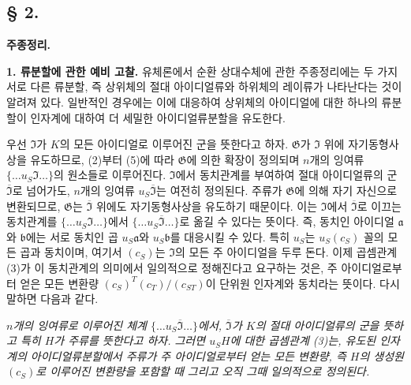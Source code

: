 \subsection*{§ 2.}
\begin{center}
\textbf{주종정리.}
\end{center}

\noindent\textbf{1. 류분할에 관한 예비 고찰.} 유체론에서 순환 상대수체에 관한 주종정리에는 두 가지 서로 다른 류분할, 즉 상위체의 절대 아이디얼류와 하위체의 레이류가 나타난다는 것이 알려져 있다. 일반적인 경우에는 이에 대응하여 상위체의 아이디얼에 대한 하나의 류분할이 인자계에 대하여 더 세밀한 아이디얼류분할을 유도한다.

우선 \(\mathfrak I\)가 \(K\)의 모든 아이디얼로 이루어진 군을 뜻한다고 하자. \(\mathfrak G\)가 \(\mathfrak I\) 위에 자기동형사상을 유도하므로, (2)부터 (5)에 따라 \(\mathfrak G\)에 의한 확장이 정의되며 \(n\)개의 잉여류 \(\{\ldots u_S\mathfrak I\ldots\}\)의 원소들로 이루어진다. \(\mathfrak I\)에서 동치관계를 부여하여 절대 아이디얼류의 군 \(\overline{\mathfrak I}\)로 넘어가도, \(n\)개의 잉여류 \(u_S\overline{\mathfrak I}\)는 여전히 정의된다. 주류가 \(\mathfrak G\)에 의해 자기 자신으로 변환되므로, \(\mathfrak G\)는 \(\overline{\mathfrak I}\) 위에도 자기동형사상을 유도하기 때문이다. 이는 \(\mathfrak I\)에서 \(\overline{\mathfrak I}\)로 이끄는 동치관계를 \(\{\ldots u_S\mathfrak I\ldots\}\)에서 \(\{\ldots u_S\overline{\mathfrak I}\ldots\}\)로 옮길 수 있다는 뜻이다. 즉, 동치인 아이디얼 \(\mathfrak a\)와 \(\mathfrak b\)에는 서로 동치인 곱 \(u_S\mathfrak a\)와 \(u_S\mathfrak b\)를 대응시킬 수 있다. 특히 \(u_S\)는 \(u_S(c_S)\) 꼴의 모든 곱과 동치이며, 여기서 \((c_S)\)는 \(\mathfrak I\)의 모든 주 아이디얼을 두루 돈다. 이제 곱셈관계 (3)가 이 동치관계의 의미에서 일의적으로 정해진다고 요구하는 것은, 주 아이디얼로부터 얻은 모든 변환량 \((c_S)^T(c_T)/(c_{ST})\)이 단위원 인자계와 동치라는 뜻이다. 다시 말하면 다음과 같다.

\emph{\(n\)개의 잉여류로 이루어진 체계 \(\{\ldots u_S\overline{\mathfrak I}\ldots\}\)에서, \(\overline{\mathfrak I}\)가 \(K\)의 절대 아이디얼류의 군을 뜻하고 특히 \(H\)가 주류를 뜻한다고 하자. 그러면 \(u_SH\)에 대한 곱셈관계 (3)는, 유도된 인자계의 아이디얼류분할에서 주류가 주 아이디얼로부터 얻는 모든 변환량, 즉 \(H\)의 생성원 \((c_S)\)로 이루어진 변환량을 포함할 때 그리고 오직 그때 일의적으로 정의된다.}

